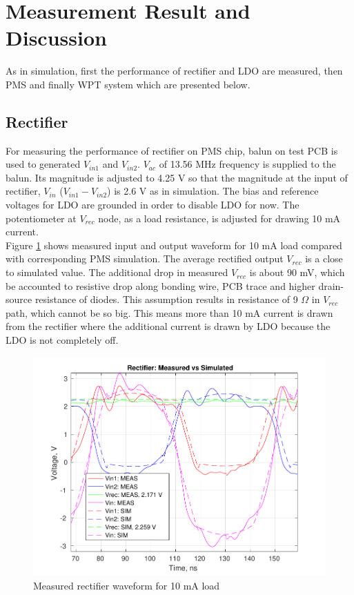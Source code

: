 \documentclass[12pt,a4paper,UKenglish]{report}
\begin{document}
\section{Measurement Result and Discussion} %
As in simulation, first the performance of rectifier and LDO are measured, then PMS and finally WPT system which are 
presented below. 

\subsection{Rectifier} %
For measuring the performance of rectifier on PMS chip, balun on test PCB is used to generated $V_{in1}$ and $V_{in2}$.  $V_{ac}$ of 
13.56 MHz frequency is supplied to the balun. Its magnitude is adjusted to 4.25 V so that the magnitude at the input of rectifier, 
$V_{in}$ ($V_{in1} -V_{in2}$) is 2.6 V as in simulation. The bias and reference voltages for LDO are grounded in order 
to disable LDO for now. The potentiometer at $V_{rec}$ node, as a load resistance, is adjusted for drawing 10 mA current. \\

Figure \ref{fig:meas_rect_10ma} shows measured input and output waveform for 10 mA load compared with corresponding 
PMS simulation. The average rectified output $V_{rec}$ is a close to simulated value. The additional drop in measured $V_{rec}$ is about 90 mV,
 which be accounted to resistive drop along bonding wire, PCB trace and higher drain-source resistance of diodes. This assumption results in resistance of 9  $\Omega$ in $V_{rec}$ path, which cannot be so big. This means more than 10 mA current is drawn from the rectifier where the additional current is drawn by LDO because the LDO is not completely off. \\
 
\begin{figure} [H]
  \centering
  \includegraphics[width=\textwidth]{img/meas/rect_10ma.pdf} 
 \caption{Measured rectifier waveform for 10 mA load} 
\label{fig:meas_rect_10ma} 
\end{figure}
 
\end{document}
